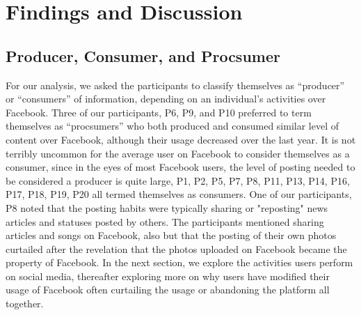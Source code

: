 \section{Findings and Discussion}
\label{sec:findings}

\subsection{Producer, Consumer, and Procsumer}
For our analysis, we asked the participants to classify themselves as ``producer'' or ``consumers'' of information, depending on an individual's activities over Facebook. Three of our participants, P6, P9, and P10 preferred to term themselves as ``procsumers'' who both produced and consumed similar level of content over Facebook, although their usage decreased over the last year. It is not terribly uncommon for the average user on Facebook to consider themselves as a consumer, since in the eyes of most Facebook users, the level of posting needed to be considered a producer is quite large, P1, P2, P5, P7, P8, P11, P13, P14, P16, P17, P18, P19, P20 all termed themselves as consumers. One of our participants, P8 noted that the posting habits were typically sharing or "reposting" news articles and statuses posted by others. The participants mentioned sharing articles and songs on Facebook, also but that the posting of their own photos curtailed after the revelation that the photos uploaded on Facebook became the property of Facebook. In the next section, we explore the activities users perform on social media, thereafter exploring more on why users have modified their usage of Facebook often curtailing the usage or abandoning the platform all together.

